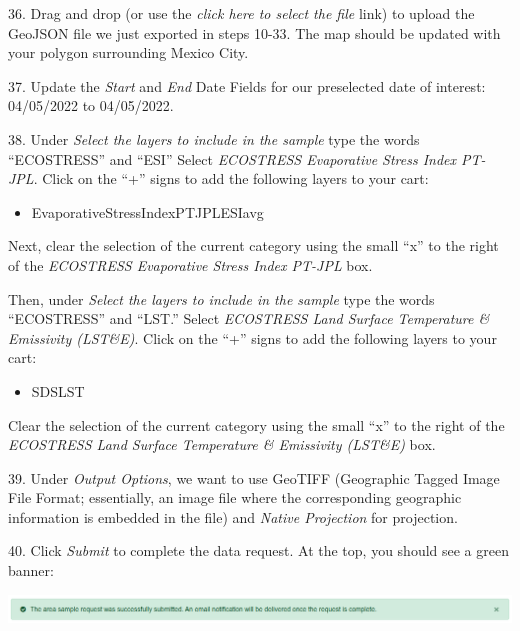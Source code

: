 \documentclass[oneside,a4paper,11pt,explicit]{book}
\begin{document}
36. Drag and drop (or use the \textit{click here to select the file} link) to upload the GeoJSON file we just exported in steps 10-33. The map should be updated with your polygon surrounding Mexico City.

37. Update the \textit{Start} and \textit{End} Date Fields for our preselected date of interest: 04/05/2022 to 04/05/2022.

38. Under \textit{Select the layers to include in the sample} type the words ``ECOSTRESS'' and ``ESI'' Select \textit{ECOSTRESS Evaporative Stress Index PT-JPL}. Click on the ``+'' signs to add the following layers to your cart: 

\begin{itemize}
	\item Evaporative\textunderscore Stress\textunderscore Index\textunderscore PT\textunderscore JPL\textunderscore ESIavg
\end{itemize}

Next, clear the selection of the current category using the small ``x'' to the right of the \textit{ECOSTRESS Evaporative Stress Index PT-JPL} box.

Then, under \textit{Select the layers to include in the sample} type the words ``ECOSTRESS'' and ``LST.'' Select \textit{ECOSTRESS Land Surface Temperature \& Emissivity (LST\&E)}. Click on the ``+'' signs to add the following layers to your cart: 

\begin{itemize}
	\item SDS\textunderscore LST
\end{itemize}

Clear the selection of the current category using the small ``x'' to the right of the \textit{ECOSTRESS Land Surface Temperature \& Emissivity (LST\&E)} box.

39. Under \textit{Output Options}, we want to use GeoTIFF (Geographic Tagged Image File Format; essentially, an image file where the corresponding geographic information is embedded in the file) and \textit{Native Projection} for projection.

40. Click \textit{Submit} to complete the data request. At the top, you should see a green banner:

\vspace{.5em}

\centerline{\includegraphics[width=\textwidth]{RequestSuccess.png}}
\end{document}
